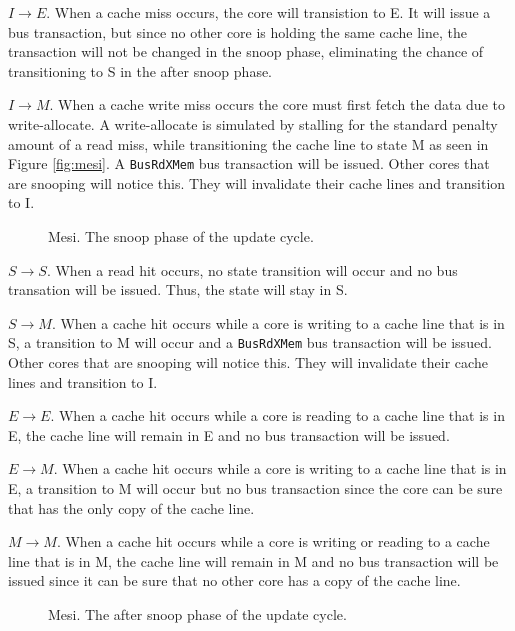 $I \to E$.
When a cache miss occurs, the core will transistion to E.
It will issue a bus transaction, but since no other core is holding the same cache line, the transaction will not be changed in the snoop phase, eliminating the chance of transitioning to S in the after snoop phase.

$I \to M$.
When a cache write miss occurs the core must first fetch the data due to write-allocate.
A write-allocate is simulated by stalling for the standard penalty amount of a read miss, while transitioning the cache line to state M as seen in Figure \ref{fig:mesi}.
A \texttt{BusRdXMem} bus transaction will be issued.
Other cores that are snooping will notice this.
They will invalidate their cache lines and transition to I.

\begin{figure}[H]
    \centering
    \caption{Mesi. The snoop phase of the update cycle.}
    \label{fig:mesi_snoop}
\end{figure}

$S \to S$.
When a read hit occurs, no state transition will occur and no bus transation will be issued.
Thus, the state will stay in S.

$S \to M$.
When a cache hit occurs while a core is writing to a cache line that is in S, a transition to M will occur and a \texttt{BusRdXMem} bus transaction will be issued.
Other cores that are snooping will notice this.
They will invalidate their cache lines and transition to I.

$E \to E$.
When a cache hit occurs while a core is reading to a cache line that is in E, the cache line will remain in E and no bus transaction will be issued.

$E \to M$.
When a cache hit occurs while a core is writing to a cache line that is in E, a transition to M will occur but no bus transaction since the core can be sure that has the only copy of the cache line.

$M \to M$.
When a cache hit occurs while a core is writing or reading to a cache line that is in M, the cache line will remain in M and no bus transaction will be issued since it can be sure that no other core has a copy of the cache line.


\begin{figure}[H]
    \centering
    \caption{Mesi. The after snoop phase of the update cycle.}
    \label{fig:mesi_after_snoop}
\end{figure}

